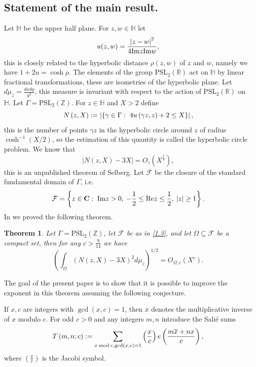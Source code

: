 \documentclass[12pt]{amsart}
\newtheorem{theorem}{Theorem}[section]
\theoremstyle{definition}
\numberwithin{equation}{section}
\newcommand{\PSL}{\mathrm{PSL}}
\newcommand{\ZZ}{\mathbb{Z}}
\newcommand{\RR}{\mathbb{R}}
\newcommand{\HH}{\mathbb{H}}
\newcommand{\PSLR}{\PSL_2(\RR)}
\newcommand{\PSLZ}{\PSL_2(\ZZ)}
\begin{document}
\subsection{Statement of the main result.} Let $\HH$ be the upper half plane. For $
z,w\in \HH$ let
\begin{equation}u(z,w)=\frac {\left|z-w\right|^2}{4\mbox{\rm Im$z$Im$
w$}},\label{1.1}\end{equation}
this is closely related to the hyperbolic distance $\rho (z,w)$ of $
z$
and $w$, namely we have $1+2u=\cosh\rho$. The elements of the
group $\PSLR$ act on $\HH$ by linear fractional transformations, these are isometries of the
hyperbolic plane. Let $d\mu_z=\frac {dxdy}{y^2}$, this measure is invariant with respect to
the action of $\PSLR$ on $\HH$. Let $\Gamma =\PSLZ$. For $z\in\HH$ and $X>2$ define
$$N\left(z,X\right):=\left|\left\{\gamma\in\Gamma :\hbox{\rm \ $4
u\left(\gamma z,z\right)+2\le X$}\right\}\right|,$$
this is the number of points $\gamma z$ in the hyperbolic circle
around $z$ of radius $\cosh^{-1}\left(X/2\right)$, so the estimation of this
quantity is called the hyperbolic circle problem. We know that
\[\left|N\left(z,X\right)-3X\right|=O_z\left(X^{\frac 23}\right),\]
this is an unpublished theorem of Selberg. Let ${\mathcal F}$ be
the closure of the standard fundamental domain of $\Gamma$, i.e.
\begin{equation}\mathcal F=\left\{z\in {\bf C}:\;\mbox{\rm Im$z>0$}
,\>-\frac 12\le\mbox{\rm Re$z$}\le\frac 12,\>\left|z\right|\ge 1\right
\}.\label{1.3}\end{equation}
In \cite[Theorem 1.1]{Biro} we proved the following
theorem.
\begin{theorem}\label{thm:1}
Let $\Gamma =\PSLZ$, let $\mathcal F$ be as in \eqref{1.3}, and let
$\Omega\subseteq\mathcal F$ be a compact set, then for any $c>\frac
9{14}$ we have
\begin{equation}\left(\int_{\Omega}\left(N\left(z,X\right)-3X\right
)^2d\mu_z\right)^{1/2}=O_{\Omega ,c}\left(X^c\right).\label{1.4}\end{equation}
\end{theorem}

The goal of the present paper is to show that it is
possible to improve the exponent in this theorem assuming
the following conjecture.

If $x,c$ are integers with $\gcd\left(x,c\right)=1$, then $\overline
x$ denotes the
multiplicative inverse of $x$ modulo $c$. For odd $c>0$ and any integers $
m,n$ introduce the Salié sums
\[T\left(m,n;c\right):=\sum_{x\:{\rm m}{\rm o}{\rm d}\:c,\gcd\left
(x,c\right)=1}\left(\frac xc\right)e\left(\frac {m\overline x+nx}
c\right),\]
where $\left(\frac xc\right)$ is the Jacobi symbol.
\end{document}
